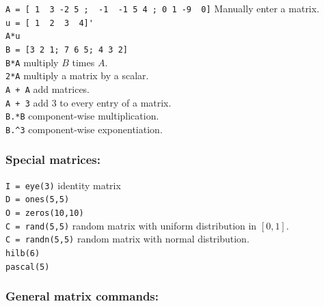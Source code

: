 \verb&A = [ 1  3 -2 5 ;  -1  -1 5 4 ; 0 1 -9  0]& \dotfill Manually enter a matrix. \\
\verb&u = [ 1  2  3  4]'&\\
\verb&A*u &\\
\verb&B = [3 2 1; 7 6 5; 4 3 2]&\\
\verb&B*A&     \dotfill multiply $B$ times $A$.\\
\verb&2*A&     \dotfill multiply a matrix by a scalar.\\
\verb&A + A&   \dotfill add matrices. \\
\verb&A + 3&   \dotfill add 3 to every entry of a matrix. \\
\verb&B.*B&  \dotfill component-wise multiplication. \\
\verb&B.^3&  \dotfill component-wise exponentiation.

\subsubsection*{Special matrices:}

\verb&I = eye(3)& \dotfill identity matrix\\
\verb&D = ones(5,5)&\\
\verb&O = zeros(10,10)&\\
\verb&C = rand(5,5)& \dotfill random matrix with uniform
         distribution in $[0,1]$.\\
\verb&C = randn(5,5)& \dotfill random matrix with normal distribution.\\
\verb&hilb(6)&\\
\verb&pascal(5)&

\subsubsection*{General matrix commands:}

